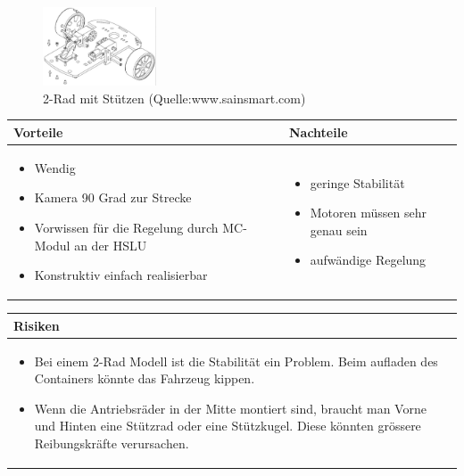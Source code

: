 \begin{figure}[h!]%
\centering
\includegraphics[width=0.3\textwidth]{fig/3rad-3.JPG}
\caption{2-Rad mit Stützen (Quelle:www.sainsmart.com)}
\label{fig:2-Rad mit Stützen}
\end{figure}


\begin{table}[h]
\begin{tabular}{p{} | p{}}


 \textbf{Vorteile} & \textbf{Nachteile} \\ \hline
	 
\begin{itemize}
\item Wendig
\item Kamera 90 Grad zur Strecke
\item Vorwissen für die Regelung durch MC-Modul an der HSLU
\item Konstruktiv einfach realisierbar
\end{itemize}

 
 &
 
\begin{itemize}
\item geringe Stabilität
\item Motoren müssen sehr genau sein
\item aufwändige Regelung
\end{itemize}

\end{tabular}
\end{table}

\begin{table}[h]
\begin{tabular}{p{}p{}}


 \textbf{Risiken} & \\ \hline
	 
\begin{itemize}
\item Bei einem 2-Rad Modell ist die Stabilität ein Problem. Beim aufladen des Containers könnte das Fahrzeug kippen.
\item Wenn die Antriebsräder in der Mitte montiert sind, braucht man Vorne und Hinten eine Stützrad oder eine Stützkugel. Diese könnten grössere Reibungskräfte verursachen.
\end{itemize}


 
\end{tabular}
\end{table}

\pagebreak